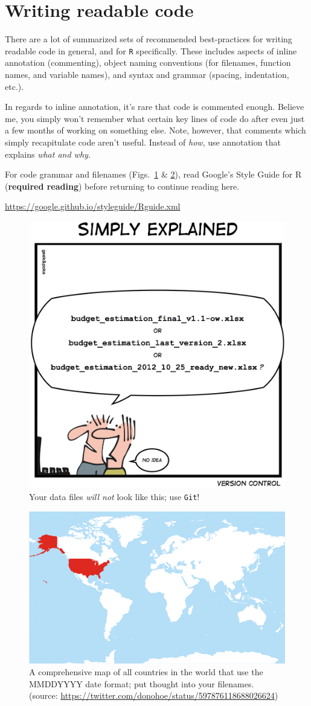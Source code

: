 \documentclass[12pt,letterpaper]{article}
\begin{document}
\section{Writing readable code}

There are a lot of summarized sets of recommended best-practices for writing readable code in general, and for \texttt{R} specifically.
These includes aspects of inline annotation (commenting), object naming conventions (for filenames, function names, and variable names), and syntax and grammar (spacing, indentation, etc.).

In regards to inline annotation, it's rare that code is commented enough.
Believe me, you simply won't remember what certain key lines of code do after even just a few months of working on something else.
Note, however, that comments which simply recapitulate code aren't useful.
Instead of \emph{how}, use annotation that explains \emph{what and why}.

For code grammar and filenames (Figs.~\ref{fig:datafilenames} \& \ref{fig:mapMMDDYYYY}), read Google's Style Guide for R (\textbf{required reading}) before returning to continue reading here.

\url{https://google.github.io/styleguide/Rguide.xml}

\begin{figure}[H]
	\centering
	\includegraphics[width=0.6\linewidth]{figs/datafilenames.png}
	\caption{Your data files \emph{will not} look like this; use \texttt{Git}!}
		\label{fig:datafilenames}
\end{figure}

\begin{figure}[H]
	\centering
	\includegraphics[width=0.6\linewidth]{figs/MapMMDDYYYY.png}
	\caption{A comprehensive map of all countries in the world that use the MMDDYYYY date format; put thought into your filenames. (source: \url{https://twitter.com/donohoe/status/597876118688026624})}
	\label{fig:mapMMDDYYYY}
\end{figure}
\end{document}
